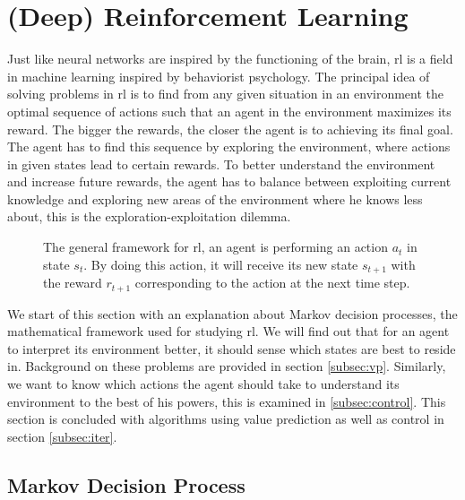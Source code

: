 \section{(Deep) Reinforcement Learning}
\label{sec:rl}

Just like neural networks are inspired by the functioning of the brain, \gls{rl} is a field in machine learning inspired by behaviorist psychology. The principal idea of solving problems in \gls{rl} is to find from any given situation in an environment the optimal sequence of actions such that an agent in the environment maximizes its reward. The bigger the rewards, the closer the agent is to achieving its final goal. The agent has to find this sequence by exploring the environment, where actions in given states lead to certain rewards. To better understand the environment and increase future rewards, the agent has to balance between exploiting current knowledge and exploring new areas of the environment where he knows less about, this is the exploration-exploitation dilemma. \\

\begin{figure}
\centering
{}
\caption[\gls{rl} paradigm]{The general framework for \gls{rl}, an agent is performing an action $a_t$ in state $s_t$. By doing this action, it will receive its new state $s_{t+1}$ with the reward $r_{t+1}$ corresponding to the action at the next time step.}
\label{fig:rl}
\end{figure}

We start of this section with an explanation about Markov decision processes, the mathematical framework used for studying \gls{rl}. We will find out that for an agent to interpret its environment better, it should sense which states are best to reside in. Background on these problems are provided in section \ref{subsec:vp}. Similarly, we want to know which actions the agent should take to understand its environment to the best of his powers, this is examined in \ref{subsec:control}. This section is concluded with algorithms using value prediction as well as control in section \ref{subsec:iter}.

\subsection{Markov Decision Process}

